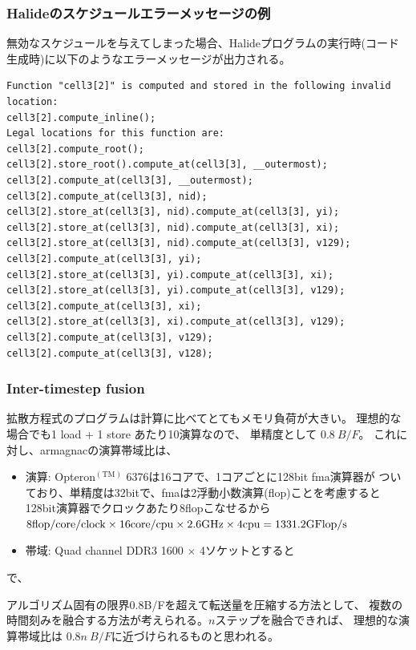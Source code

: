 \documentclass[dvipdfmx,cjk]{beamer}
\begin{document}
\begin{frame}[fragile]\frametitle{Halideのスケジュールエラーメッセージの例}

無効なスケジュールを与えてしまった場合、Halideプログラムの実行時(コード生成時)に以下のようなエラーメッセージが出力される。

\begingroup \fontsize{8pt}{9pt}\selectfont
\begin{verbatim}
Function "cell3[2]" is computed and stored in the following invalid location:
cell3[2].compute_inline();
Legal locations for this function are:
cell3[2].compute_root();
cell3[2].store_root().compute_at(cell3[3], __outermost);
cell3[2].compute_at(cell3[3], __outermost);
cell3[2].compute_at(cell3[3], nid);
cell3[2].store_at(cell3[3], nid).compute_at(cell3[3], yi);
cell3[2].store_at(cell3[3], nid).compute_at(cell3[3], xi);
cell3[2].store_at(cell3[3], nid).compute_at(cell3[3], v129);
cell3[2].compute_at(cell3[3], yi);
cell3[2].store_at(cell3[3], yi).compute_at(cell3[3], xi);
cell3[2].store_at(cell3[3], yi).compute_at(cell3[3], v129);
cell3[2].compute_at(cell3[3], xi);
cell3[2].store_at(cell3[3], xi).compute_at(cell3[3], v129);
cell3[2].compute_at(cell3[3], v129);
cell3[2].compute_at(cell3[3], v128);
\end{verbatim}
\endgroup

\end{frame}


\begin{frame}\frametitle{Inter-timestep fusion}
  拡散方程式のプログラムは計算に比べてとてもメモリ負荷が大きい。
  理想的な場合でも1 load + 1 store あたり10演算なので、
  単精度として $0.8~B/F$。
  これに対し、armagnacの演算帯域比は、
  \begin{itemize}
  \item 演算: Opteron${}^\mathrm{(TM)}$ 6376は16コアで、1コアごとに128bit fma演算器が
    ついており、単精度は32bitで、fmaは2浮動小数演算(flop)ことを考慮すると128bit演算器でクロックあたり8flopこなせるから $\rm 8flop/core/clock \times 16 core/cpu \times 2.6GHz \times 4cpu = 1331.2GFlop/s$
  \item 帯域: Quad channel DDR3 1600 $\times$ 4ソケットとすると
  \end{itemize}
  
  で、
  
  アルゴリズム固有の限界0.8B/Fを超えて転送量を圧縮する方法として、
  複数の時間刻みを融合する方法が考えられる。$n$ステップを融合できれば、
  理想的な演算帯域比は
   $0.8n~B/F$に近づけられるものと思われる。

\end{frame}
\end{document}
